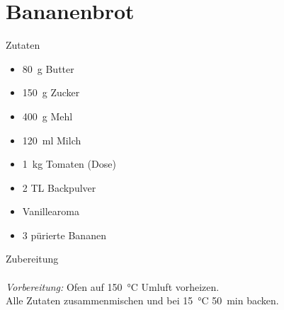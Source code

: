 \section*{Bananenbrot}
\ihead{}\ohead{}
\cfoot{}
{\Large Zutaten}
\begin{multicols}{2}
\begin{itemize}
    \item \SI{80}{g} Butter
    \item \SI{150}{g} Zucker
    \item \SI{400}{g} Mehl
    \item \SI{120}{ml} Milch
    \item \SI{1}{kg} Tomaten (Dose)
    \item \num{2} TL Backpulver
    \item Vanillearoma
    \item \num{3} pürierte Bananen
\end{itemize}
\end{multicols}
\noindent
{\Large Zubereitung}\\
\\
\textit{Vorbereitung:} Ofen auf \SI{150}{\celsius} Umluft vorheizen.\\
Alle Zutaten zusammenmischen und bei \SI{15}{\celsius} \SI{50}{min} backen.